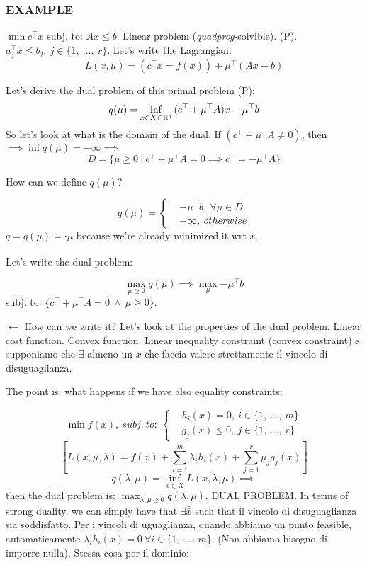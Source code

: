 \subsubsection{EXAMPLE}

$\min{c^\top x}$ subj. to: $Ax\leq b$. Linear problem (\emph{quadprog}-solvible). (P). $a_j^\top x\leq b_j,\ j\in\{1,\ \dots,\ r\}$. Let's write the Lagrangian:
\[
	L(x,\mu) = (c^\top x = f(x)) + \mu^\top (Ax-b)
\]

Let's derive the dual problem of this primal problem (P):
\[
	q(\mu) = \inf_{x\in X\subset\mathbb{R}^d}{(c^\top + \mu^\top A)x - \mu^\top b}
\]
So let's look at what is the domain of the dual. If $(c^\top + \mu^\top A \neq 0)$, then $\implies \inf{q(\mu)} = -\infty \implies$
\[
	D = \{\mu\geq 0\ |\ c^\top + \mu^\top A = 0\implies c^\top = -\mu^\top A\}
\]

How can we define $q(\mu)$?

\[
	q(\mu) =
	\left\{
	\begin{aligned}
	&-\mu^\top b,\ \forall\mu\in D\\
	&-\infty,\ otherwise
	\end{aligned}
	\right.
\]
$\underline{q = q(\mu) = \mathord{\cdot}\mu}$ because we're already minimized it wrt $x$.

Let's write the dual problem:

\[
	\max_{\mu\geq 0}{q(\mu)} \implies \max_\mu{-\mu^\top b}
\]
subj. to: $\{c^\top + \mu^\top A = 0\ \land\ \mu\geq 0\}$.

$\leftarrow$ How can we write it? Let's look at the properties of the dual problem. Linear cost function. Convex function. Linear inequality constraint (convex constraint) e supponiamo che $\exists$ almeno un $x$ che faccia valere strettamente il vincolo di disuguaglianza.

The point is: what happens if we have also equality constraints:

\[
	\min{f(x)},\ subj.\ to:\
	\left\{
	\begin{aligned}
	&h_i(x) = 0,\ i\in\{1,\ \dots,\ m\}\\
	&g_j(x)\leq 0,\ j\in\{1,\ \dots,\ r\}
	\end{aligned}
	\right.
\]
\[
	[L(x,\mu,\lambda) = f(x) + \sum_{i=1}^m{\lambda_ih_i(x)} + \sum_{j=1}^r{\mu_jg_j(x)}]
\]
\[
	q(\lambda,\mu) = \inf_{x\in X}{L(x,\lambda,\mu)} \implies
\]
then the dual problem is: $\max_{\lambda,\mu\geq 0}{q(\lambda,\mu)}$. DUAL PROBLEM. In terms of strong duality, we can simply have that $\exists\bar{\bar{x}}$ such that il vincolo di disuguaglianza sia soddisfatto. Per i vincoli di uguaglianza, quando abbiamo un punto feasible, automaticamente $\lambda_ih_i(x)=0\ \forall i\in\{1,\ \dots,\ m\}$. (Non abbiamo bisogno di imporre nulla). Stessa cosa per il dominio:

